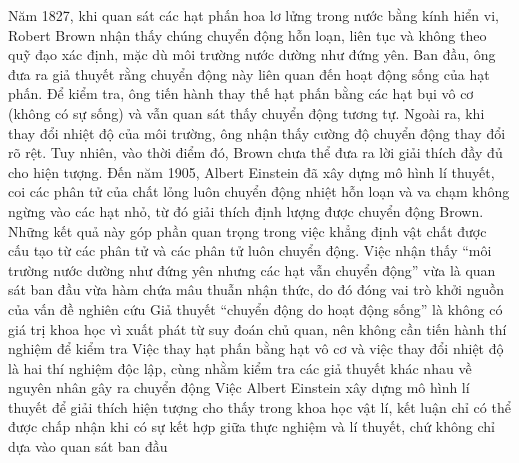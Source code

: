 	\begin{ex}%
		Năm 1827, khi quan sát các hạt phấn hoa lơ lửng trong nước bằng kính hiển vi, Robert Brown nhận thấy chúng chuyển động hỗn loạn, liên tục và không theo quỹ đạo xác định, mặc dù môi trường nước dường như đứng yên. Ban đầu, ông đưa ra giả thuyết rằng chuyển động này liên quan đến hoạt động sống của hạt phấn. Để kiểm tra, ông tiến hành thay thế hạt phấn bằng các hạt bụi vô cơ (không có sự sống) và vẫn quan sát thấy chuyển động tương tự. Ngoài ra, khi thay đổi nhiệt độ của môi trường, ông nhận thấy cường độ chuyển động thay đổi rõ rệt. Tuy nhiên, vào thời điểm đó, Brown chưa thể đưa ra lời giải thích đầy đủ cho hiện tượng. Đến năm 1905, Albert Einstein đã xây dựng mô hình lí thuyết, coi các phân tử của chất lỏng luôn chuyển động nhiệt hỗn loạn và va chạm không ngừng vào các hạt nhỏ, từ đó giải thích định lượng được chuyển động Brown. Những kết quả này góp phần quan trọng trong việc khẳng định vật chất được cấu tạo từ các phân tử và các phân tử luôn chuyển động.
		\choiceTFt
		{\True Việc nhận thấy ``môi trường nước dường như đứng yên nhưng các hạt vẫn chuyển động'' vừa là quan sát ban đầu vừa hàm chứa mâu thuẫn nhận thức, do đó đóng vai trò khởi nguồn của vấn đề nghiên cứu}
		{Giả thuyết ``chuyển động do hoạt động sống'' là không có giá trị khoa học vì xuất phát từ suy đoán chủ quan, nên không cần tiến hành thí nghiệm để kiểm tra}
		{\True Việc thay hạt phấn bằng hạt vô cơ và việc thay đổi nhiệt độ là hai thí nghiệm độc lập, cùng nhằm kiểm tra các giả thuyết khác nhau về nguyên nhân gây ra chuyển động}
		{\True Việc Albert Einstein xây dựng mô hình lí thuyết để giải thích hiện tượng cho thấy trong khoa học vật lí, kết luận chỉ có thể được chấp nhận khi có sự kết hợp giữa thực nghiệm và lí thuyết, chứ không chỉ dựa vào quan sát ban đầu}
	\end{ex}

